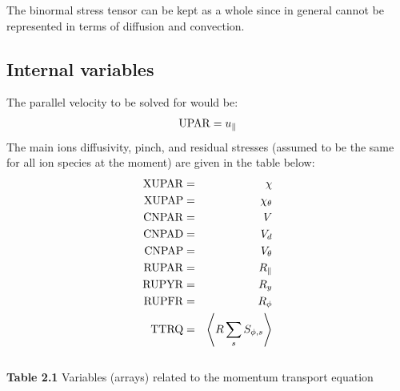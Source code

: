 The binormal stress tensor can be kept as a whole since in general cannot be represented in terms of diffusion and convection.
%
\subsection{Internal variables}
The parallel velocity to be solved for would be:
\begin{eqnarray}
{\rm UPAR} = u_\parallel
\label{upardefastra}
\end{eqnarray}
The main ions diffusivity, pinch, and residual stresses (assumed to be the same for all ion species at the moment) are
given in the table below:
\begin{eqnarray}
{\rm XUPAR} &=& \chi \nonumber \\
{\rm XUPAP} &=& \chi_\theta \nonumber \\
{\rm CNPAR} &=& V \nonumber \\
{\rm CNPAD} &=& V_d \nonumber \\
{\rm CNPAP} &=& V_\theta \nonumber \\
{\rm RUPAR} &=& R_{\parallel} \nonumber \\
{\rm RUPYR} &=& R_y  \nonumber \\
{\rm RUPFR} &=& R_{\phi} \nonumber \\
{\rm TTRQ} &=& \left\langle R \sum_s S_{\phi,s}\right\rangle
\label{turbstuffdefastra}
\end{eqnarray}
\\
{\bf Table 2.1} Variables (arrays) related to the momentum transport equation\\[2ex]
